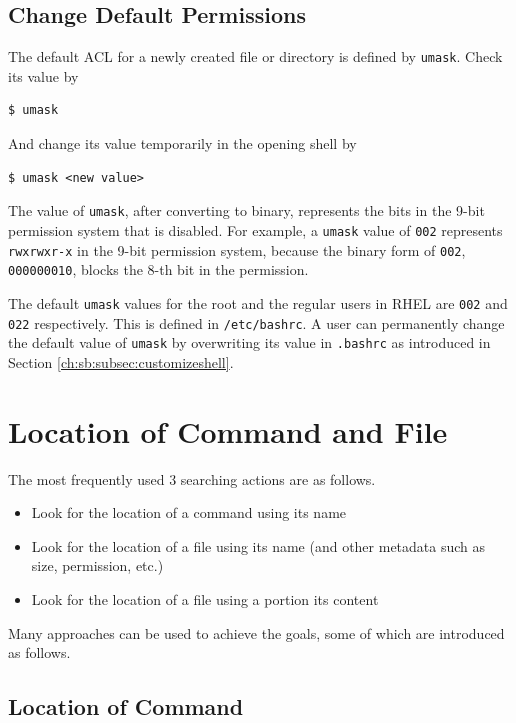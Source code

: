 \subsection{Change Default Permissions}

The default ACL for a newly created file or directory is defined by \verb|umask|. Check its value by
\begin{lstlisting}
$ umask
\end{lstlisting}
And change its value temporarily in the opening shell by
\begin{lstlisting}
$ umask <new value>
\end{lstlisting}

The value of \verb|umask|, after converting to binary, represents the bits in the 9-bit permission system that is disabled. For example, a \verb|umask| value of \verb|002| represents \verb|rwxrwxr-x| in the 9-bit permission system, because the binary form of \verb|002|, \verb|000000010|, blocks the $8$-th bit in the permission.

The default \verb|umask| values for the root and the regular users in RHEL are \verb|002| and \verb|022| respectively. This is defined in \verb|/etc/bashrc|. A user can permanently change the default value of \verb|umask| by overwriting its value in \verb|.bashrc| as introduced in Section \ref{ch:sb:subsec:customizeshell}.

\section{Location of Command and File}

The most frequently used 3 searching actions are as follows.
\begin{itemize}
  \item Look for the location of a command using its name
  \item Look for the location of a file using its name (and other metadata such as size, permission, etc.)
  \item Look for the location of a file using a portion its content
\end{itemize}

Many approaches can be used to achieve the goals, some of which are introduced as follows.

\subsection{Location of Command}

